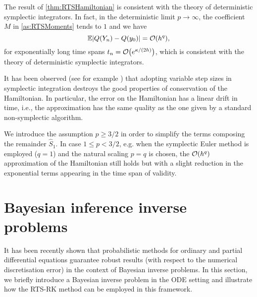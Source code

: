 \documentclass[10pt]{article}
\begin{document}
\begin{remark} The result of \cref{thm:RTSHamiltonian} is consistent with the theory of deterministic symplectic integrators. In fact, in the deterministic limit $p \to \infty$, the coefficient $M$ in \cref{as:RTSMoments} tends to $1$ and we have
	\begin{equation}
	\operatorname{\mathbb{E}} \lvert Q(Y_n) - Q(y_0)\rvert = \mathcal{O}(h^q),
	\end{equation}
	for exponentially long time spans $t_n = \mathcal{O}\big(e^{\kappa/(2h)}\big)$, which is consistent with the theory of deterministic symplectic integrators. 
\end{remark}
\begin{remark} It has been observed (see for example \cite{Hai97, HLW06}) that adopting variable step sizes in symplectic integration destroys the good properties of conservation of the Hamiltonian. In particular, the error on the Hamiltonian has a linear drift in time, i.e., the approximation has the same quality as the one given by a standard non-symplectic algorithm. %
\end{remark}
\begin{remark} We introduce the assumption $p \geq 3/2$ in order to simplify the terms composing the remainder $\widehat S_1$. In case $1 \leq p < 3/2$, e.g. when the symplectic Euler method is employed ($q = 1$) and the natural scaling $p = q$ is chosen, the $\mathcal{O}(h^q)$ approximation of the Hamiltonian still holds but with a slight reduction in the exponential terms appearing in the time span of validity.
\end{remark}

\section{Bayesian inference inverse problems}\label{sec:BayesianInference} It has been recently shown \cite{CGS16, CCC16, LST18} that probabilistic methods for ordinary and partial differential equations guarantee robust results (with respect to the numerical discretisation error) in the context of Bayesian inverse problems. In this section, we briefly introduce a Bayesian inverse problem in the ODE setting and illustrate how the RTS-RK method can be employed in this framework. 
\end{document}
